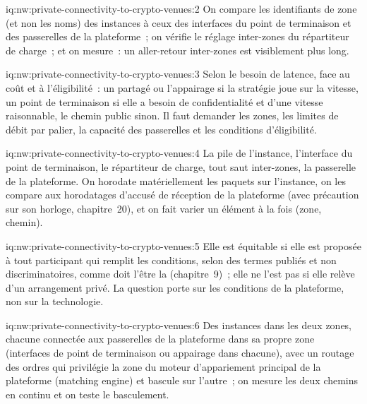 \begin{solution}{iq:nw:private-connectivity-to-crypto-venues:2}
On compare les identifiants de zone (et non les noms) des instances à ceux des interfaces du point de terminaison et des passerelles de la plateforme~; on vérifie le réglage
inter-zones du répartiteur de charge~; et on mesure~: un aller-retour inter-zones est visiblement plus long.
\end{solution}

\begin{solution}{iq:nw:private-connectivity-to-crypto-venues:3}
Selon le besoin de latence, face au coût et à l'éligibilité~: un  partagé ou l'appairage si la stratégie joue sur la vitesse, un point de terminaison si elle a besoin de confidentialité et
d'une vitesse raisonnable, le chemin public sinon. Il faut demander les zones, les limites de débit par palier, la capacité des passerelles et les conditions d'éligibilité.
\end{solution}

\begin{solution}{iq:nw:private-connectivity-to-crypto-venues:4}
La pile de l'instance, l'interface du point de terminaison, le répartiteur de charge, tout saut inter-zones, la passerelle de la plateforme. On horodate matériellement les paquets sur
l'instance, on les compare aux horodatages d'accusé de réception de la plateforme (avec précaution sur son horloge, chapitre~20), et on fait varier un élément à la fois (zone, chemin).
\end{solution}

\begin{solution}{iq:nw:private-connectivity-to-crypto-venues:5}
Elle est équitable si elle est proposée à tout participant qui remplit les conditions, selon des termes publiés et non discriminatoires, comme doit l'être la  (chapitre~9)~; elle ne l'est pas
si elle relève d'un arrangement privé. La question porte sur les conditions de la plateforme, non sur la technologie.
\end{solution}

\begin{solution}{iq:nw:private-connectivity-to-crypto-venues:6}
Des instances dans les deux zones, chacune connectée aux passerelles de la plateforme dans sa propre zone (interfaces de point de terminaison ou appairage dans chacune), avec un routage des ordres qui
privilégie la zone du moteur d'appariement principal de la plateforme (matching engine) et bascule sur l'autre~; on mesure les deux chemins en continu et on teste le basculement.
\end{solution}
